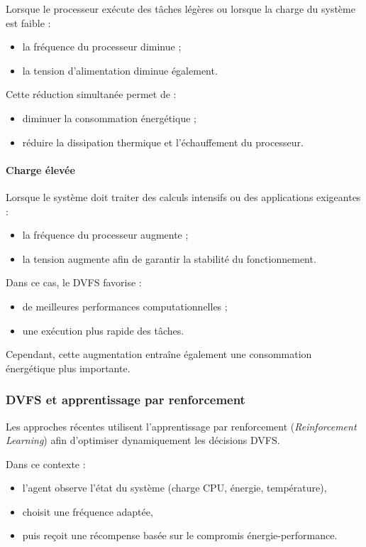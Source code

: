 \documentclass[12pt,a4paper]{report}
\begin{document}
Lorsque le processeur exécute des tâches légères ou lorsque la charge du système est faible :
\begin{itemize}
    \item la fréquence du processeur diminue ;
    \item la tension d’alimentation diminue également.
\end{itemize}

Cette réduction simultanée permet de :
\begin{itemize}
    \item diminuer la consommation énergétique ;
    \item réduire la dissipation thermique et l’échauffement du processeur.
\end{itemize}

\paragraph{Charge élevée}

Lorsque le système doit traiter des calculs intensifs ou des applications exigeantes :
\begin{itemize}
    \item la fréquence du processeur augmente ;
    \item la tension augmente afin de garantir la stabilité du fonctionnement.
\end{itemize}

Dans ce cas, le DVFS favorise :
\begin{itemize}
    \item de meilleures performances computationnelles ;
    \item une exécution plus rapide des tâches.
\end{itemize}

Cependant, cette augmentation entraîne également une consommation énergétique plus importante.

\subsubsection{DVFS et apprentissage par renforcement}

Les approches récentes utilisent l’apprentissage par renforcement (\textit{Reinforcement Learning}) afin d’optimiser dynamiquement les décisions DVFS.

Dans ce contexte :
\begin{itemize}
    \item l’agent observe l’état du système (charge CPU, énergie, température),
    \item choisit une fréquence adaptée,
    \item puis reçoit une récompense basée sur le compromis énergie-performance.
\end{itemize}
\end{document}
